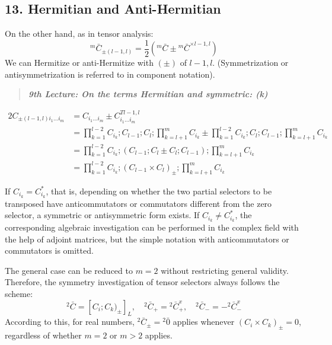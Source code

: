 \documentclass[11pt,a4paper,oneside]{article}
\newenvironment{fancyquote}
    {\begin{quote}\itshape\color{theoryblue!80!black}\guillemotleft\;}
    {\;\guillemotright\end{quote}}
\begin{document}
\subsection{13. Hermitian and Anti-Hermitian}
On the other hand, as in tensor analysis:
\begin{equation*}
{}^m \bar {C}_{ \pm(l-1,l)} = \frac {1} {2}({}^m \bar {C} \pm {}^m \bar {C}^{\times l-1,l} )
\end{equation*}
We can Hermitize or anti-Hermitize with $(\pm)$ of $l-1,l$. (Symmetrization or antisymmetrization is referred to in component notation). 

\begin{fancyquote}
    \textbf{9th Lecture: On the terms Hermitian and symmetric: (k)}
\end{fancyquote}

\begin{align*}
2C_{\pm(l-1,l)i_1 ... i_m} &= C_{i_1 ... i_m} \pm C_{i_1 ... i_m}^{Tl-1,l} \\
&= \prod_{k = 1}^{l-2} C_{i_k}; C_{l-1}; C_l;\prod_{k = l + 1}^m C_{i_k } \pm \prod_{k = 1}^{l-2} C_{i_k}; C_l; C_{l-1}; \prod_{k = l + 1}^m C_{i_k} \\
&= \prod_{k = 1}^{l-2} C_{i_k}; (C_{l-1}; C_l \pm C_l; C_{l-1}); \prod_{k = l + 1}^m C_{i_k} \\
&= \prod_{k = 1}^{l-2} C_{i_k};(C_{l-1} \times C_l)_{\pm}; \prod_{k = l + 1}^m C_{ i_k}
\end{align*}

If $C_{i_k} = C_{i_k}^{*}$, that is, depending on whether the two partial selectors to be transposed have anticommutators or commutators different from the zero selector, a symmetric or antisymmetric form exists. If $C_{i_k} \neq C_{i_k}^*$, the corresponding algebraic investigation can be performed in the complex field with the help of adjoint matrices, but the simple notation with anticommutators or commutators is omitted.

The general case can be reduced to $m = 2$ without restricting general validity. Therefore, the symmetry investigation of tensor selectors always follows the scheme:
\begin{equation}
    {}^2 \bar {C} = [C_i; C_k)_{\pm}]_L,\quad {}^2 \bar {C}_+ = {}^2 \bar {C}_+^x,\quad {}^2 \bar {C}_- =-{}^2 \bar {C}_-^x \tag {M12}
\end{equation}
According to this, for real numbers, ${}^2 \bar {C}_{\pm } = {}^2 \bar {0}$ applies whenever $(C_i \times C_k)_{\pm } = 0$, regardless of whether $m = 2$ or $m > 2$ applies.
\end{document}
